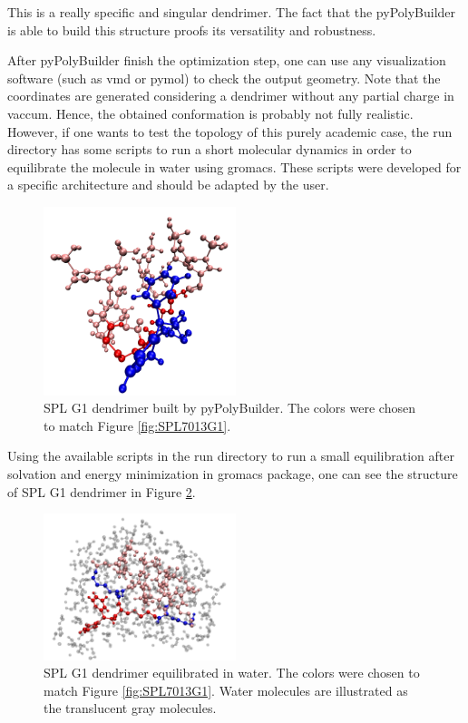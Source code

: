 This is a really specific and singular dendrimer.
The fact that the pyPolyBuilder is able to build this structure proofs its versatility and robustness.

After pyPolyBuilder finish the optimization step, one can use any visualization software (such as vmd or pymol) to check the output geometry. 
Note that the coordinates are generated considering a dendrimer without any partial charge in vaccum.
Hence, the obtained conformation is probably not fully realistic.
However, if one wants to test the topology of this purely academic case, the run directory has some scripts to run a short molecular dynamics in order to equilibrate the molecule in water using gromacs.
These scripts were developed for a specific architecture and should be adapted by the user.

\begin{figure}
    \centering
    \includegraphics[width=0.5\textwidth]{SPL7013/SPL1.pdf}
    \caption{SPL G1 dendrimer built by pyPolyBuilder.
             The colors were chosen to match Figure \ref{fig:SPL7013G1}.}
    \label{fig:SPL7013PPB}
\end{figure}

Using the available scripts in the run directory to run a small equilibration after solvation and energy minimization in gromacs package, one can see the structure of SPL G1 dendrimer in Figure \ref{fig:SPL7013SOL}.

\begin{figure}
    \centering
    \includegraphics[width=0.5\textwidth]{SPL7013/SPLSOL.pdf}
    \caption{SPL G1 dendrimer equilibrated in water.
             The colors were chosen to match Figure \ref{fig:SPL7013G1}.
             Water molecules are illustrated as the translucent gray molecules.}
    \label{fig:SPL7013SOL}
\end{figure}


